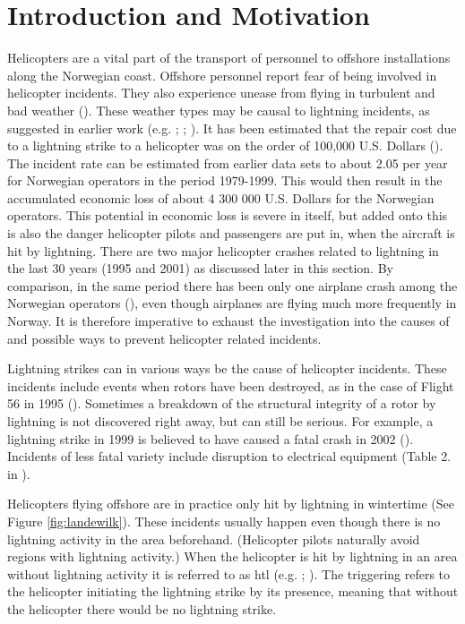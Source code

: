 \chapter{Introduction and Motivation}\label{ch:introduction}

Helicopters are a vital part of the transport of personnel to offshore installations along the Norwegian coast. Offshore personnel report fear of being involved in helicopter incidents. They also experience unease from flying in turbulent and bad weather (\cite{wasilewska2019}). These weather types may be causal to lightning incidents, as suggested in earlier work (e.g. \cite{lande1999}; \cite{wilkinson2013}; \cite{smart1997}). It has been estimated that the repair cost due to a lightning strike to a helicopter was on the order of 100,000 U.S. Dollars (\cite{lande1999}). The incident rate can be estimated from earlier data sets to about 2.05 per year for Norwegian operators in the period 1979-1999. This would then result in the accumulated economic loss of about 4 300 000 U.S. Dollars for the Norwegian operators. This potential in economic loss is severe in itself, but added onto this is also the danger helicopter pilots and passengers are put in, when the aircraft is hit by lightning. There are two major helicopter crashes related to lightning in the last 30 years (1995 and 2001) as discussed later in this section. By comparison, in the same period there has been only one airplane crash among the Norwegian operators (\cite{bodo}), even though airplanes are flying much more frequently in Norway. It is therefore imperative to exhaust the investigation into the causes of and possible ways to prevent helicopter related incidents. 

Lightning strikes can in various ways be the cause of helicopter incidents. These incidents include events when rotors have been destroyed, as in the case of Flight 56 in 1995 (\cite{smart1997}). Sometimes a breakdown of the structural integrity of a rotor by lightning is not discovered right away, but can still be serious. For example, a lightning strike in 1999 is believed to have caused a fatal crash in 2002 (\cite{smart2005}). Incidents of less fatal variety include disruption to electrical equipment (Table 2. in \cite{uman2003}). 

Helicopters flying offshore are in practice only hit by lightning in wintertime (See Figure \ref{fig:landewilk}). These incidents usually happen even though there is no lightning activity in the area beforehand. (Helicopter pilots naturally avoid regions with lightning activity.) When the helicopter is hit by lightning in an area without lightning activity it is referred to as \acrfull{htl} (e.g. \cite{lande1999}; \cite{wilkinson2013}). The triggering refers to the helicopter initiating the lightning strike by its presence, meaning that without the helicopter there would be no lightning strike.

